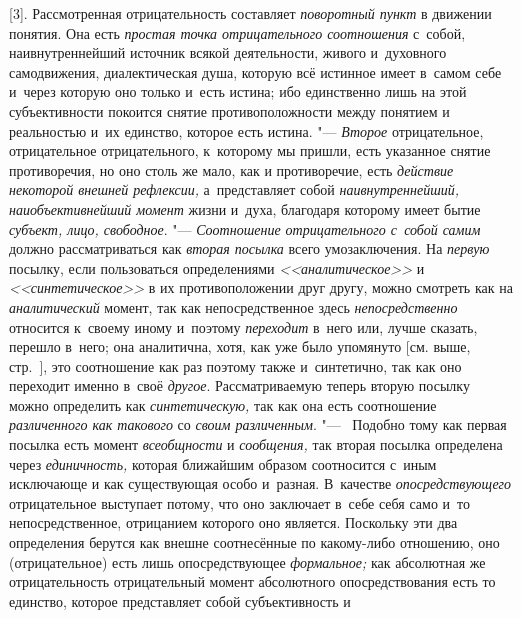 [3]. Рассмотренная отрицательность составляет {\em поворотный пункт} в
движении понятия. Она есть {\em простая
точка отрицательного соотношения} с~собой, наивнутреннейший
источник всякой деятельности, живого и~духовного самодвижения,
диалектическая душа, которую всё истинное имеет в~самом себе и~через
которую оно только и~есть истина; ибо единственно лишь на этой
субъективности покоится снятие противоположности между понятием и
реальностью и~их единство, которое есть истина. "--- {\em Второе}
отрицательное, отрицательное отрицательного, к~которому мы
пришли, есть указанное снятие противоречия, но оно столь же мало, как и
противоречие, есть {\em действие
некоторой внешней рефлексии,} а~представляет собой
{\em наивнутреннейший, наиобъективнейший
момент} жизни и~духа, благодаря которому имеет бытие
{\em субъект, лицо, свободное}. "--- {\em Соотношение отрицательного с~собой
самим} должно рассматриваться как {\em вторая посылка} всего умозаключения. На
{\em первую} посылку, если пользоваться определениями
{\em <<аналитическое>>} и {\em <<синтетическое>>} в
их противоположении друг другу, можно смотреть как на {\em аналитический}
момент, так как непосредственное здесь {\em непосредственно}
относится к~своему иному и~поэтому {\em переходит} в~него
или, лучше сказать, перешло в~него; она аналитична, хотя, как уже было
упомянуто [см. выше, стр.~\pageref{bkm:bmpg224a}], это
соотношение как раз поэтому также и~синтетично, так как оно переходит
именно в~своё {\em другое}. Рассматриваемую теперь вторую
посылку можно определить как {\em синтетическую,} так
как она есть соотношение {\em различенного как такового} со {\em своим
различенным}. "--- ~Подобно тому как первая посылка есть момент
{\em всеобщности} и {\em сообщения,} так
вторая посылка определена через {\em единичность,}
которая ближайшим образом соотносится с~иным исключающе и
как существующая особо и~разная. В~качестве {\em опосредствующего}
отрицательное выступает потому, что оно заключает в~себе себя
само и~то непосредственное, отрицанием которого оно
является. Поскольку эти два определения берутся как внешне соотнесённые по
какому-либо отношению, оно (отрицательное) есть лишь опосредствующее
{\em формальное;} как
абсолютная же отрицательность отрицательный момент абсолютного
опосредствования есть то единство, которое представляет собой субъективность и
